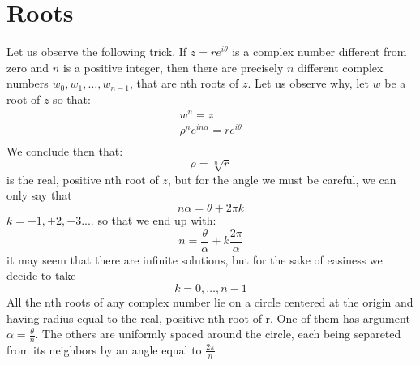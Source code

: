 \section{Roots}
Let us observe the following trick, If $z = r e^{i \theta} $ is a complex number different from zero and $n$ is a positive integer, then there are precisely $n$ different complex numbers $ w_0, w_1, \ldots, w_{n-1}$, that are nth roots of $z$. Let us observe why, let $w$ be a root of $z$ so that:
\begin{align*}
w^n  = z \\
\rho^n e^{in \alpha} = r e^{i \theta} \\
\end{align*}
We conclude then that:
\[ \rho = \sqrt[n]{r} \]
 is the real, positive nth root of $z$, but for the angle we must be careful, we can only say that
 \[ n\alpha = \theta + 2\pi k  \] 
 $k = \pm 1, \pm 2, \pm 3 .... $ so that we end up with:
 \[ n = \frac{\theta}{\alpha} + k\frac{2\pi}{\alpha} \]
 it may seem that there are infinite solutions, but for the sake of easiness we decide to take 
 \[ k = 0, \ldots, n-1 \]
 All the nth roots of any complex number lie on a circle centered at the origin and having radius equal to the real, positive nth root of r. One of them has argument $ \alpha = \frac{\theta}{n} $. The others are uniformly spaced around the circle, each being separeted from its neighbors by an angle equal to $ \frac{2\pi}{n} $